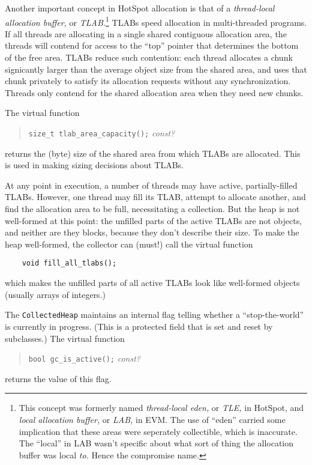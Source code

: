 \documentclass{article}
\begin{document}
Another important concept in HotSpot allocation is that of a {\em
thread-local allocation buffer,} or {\em TLAB.}\footnote{This concept
was formerly named {\em thread-local eden,} or {\em TLE,} in HotSpot,
and {\em local allocation buffer,} or {\em LAB,} in EVM.  The use of
``eden'' carried some implication that these areas were seperately
collectible, which is inaccurate.  The ``local'' in LAB wasn't
specific about what sort of thing the allocation buffer was local {\em
to.}  Hence the compromise name.}  TLABs speed allocation in
multi-threaded programs.  If all threads are allocating in a single shared
contiguous allocation area, the threads will contend for access to the
``top'' pointer that determines the bottom of the free area.  TLABs
reduce such contention: each thread allocates a chunk signicantly
larger than the average object size from the shared area, and uses
that chunk privately to satisfy its allocation requests without any
synchronization.  Threads only contend for the shared allocation area
when they need new chunks.

The virtual function
\begin{quote}
  {\tt size\_t tlab\_area\_capacity();} {\em const?}
\end{quote}
returns the (byte) size of the shared area from which TLABs are
allocated.  This is used in making sizing decisions about TLABs.

At any point in execution, a number of threads may have active,
partially-filled TLABs.  However, one thread may fill its TLAB,
attempt to allocate another, and find the allocation area to be full,
necessitating a collection.  But the heap is not well-formed at this
point: the unfilled parts of the active TLABs are not objects, and
neither are they blocks, because they don't describe their size.  To
make the heap well-formed, the collector can (must!) call the virtual
function
\begin{verbatim}
    void fill_all_tlabs();
\end{verbatim}
which makes the unfilled parts of all active TLABs look like
well-formed objects (usually arrays of integers.)

The {\tt CollectedHeap} maintains an internal flag telling whether a
``stop-the-world'' is currently in progress.  (This is a protected
field that is set and reset by subclasses.)  The virtual function
\begin{quote}
  {\tt bool gc\_is\_active();} {\em const?}
\end{quote}
returns the value of this flag.
\end{document}
